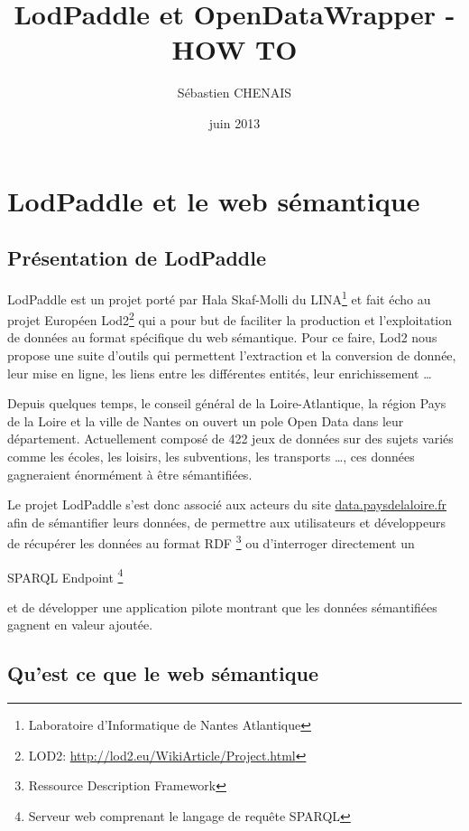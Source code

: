 \documentclass[a4paper]{article}
\title{LodPaddle et OpenDataWrapper - HOW TO}
\author{Sébastien CHENAIS}
\date{juin 2013}
\begin{document}
\maketitle
\newpage

\tableofcontents %
\newpage

\section{LodPaddle et le web sémantique}
\subsection{Présentation de LodPaddle}

LodPaddle est un projet porté par Hala Skaf-Molli du LINA\footnote{Laboratoire
d'Informatique de Nantes Atlantique} et fait écho au projet Européen
Lod2\footnote{LOD2:
\href{http://lod2.eu/WikiArticle/Project.html}{http://lod2.eu/WikiArticle/Project.html}}
qui a pour but de faciliter la production et l'exploitation de données au format
spécifique du web sémantique. Pour ce faire, Lod2 nous propose une suite
d'outils qui permettent l'extraction et la conversion de donnée, leur mise en
ligne, les liens entre les différentes entités, leur enrichissement \ldots{}

Depuis quelques temps, le conseil général de la Loire-Atlantique, la région Pays
de la Loire et la ville de Nantes on ouvert un pole Open Data dans leur
département. Actuellement composé de 422 jeux de données sur des sujets variés
comme les écoles, les loisirs, les subventions, les transports \ldots{}, ces
données gagneraient énormément à être sémantifiées.

Le projet LodPaddle s'est donc associé aux acteurs du site
\href{http://data.paysdelaloire.fr}{data.paysdelaloire.fr} afin de sémantifier
leurs données, de permettre aux utilisateurs et développeurs de récupérer les
données au format RDF \footnote{Ressource Description Framework} ou d'interroger
directement un \begin{itshape}SPARQL Endpoint \footnote{Serveur web comprenant
le langage de requête SPARQL}\end{itshape} et de développer une application
pilote montrant que les données sémantifiées gagnent en valeur ajoutée.

\subsection{Qu'est ce que le web sémantique}
\end{document}
